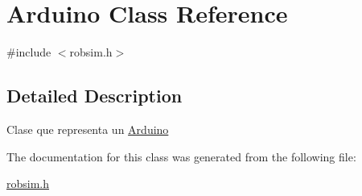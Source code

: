 \hypertarget{class_arduino}{}\section{Arduino Class Reference}
\label{class_arduino}


{\ttfamily \#include $<$robsim.\+h$>$}



\subsection{Detailed Description}
Clase que representa un \hyperlink{class_arduino}{Arduino} 

The documentation for this class was generated from the following file\+:\begin{DoxyCompactItemize}
\item 
\hyperlink{robsim_8h}{robsim.\+h}\end{DoxyCompactItemize}
